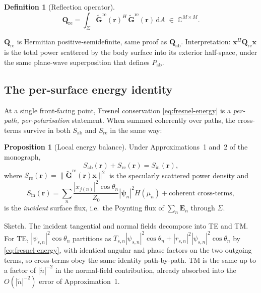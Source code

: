 \documentclass[11pt,a4paper]{article}
\theoremstyle{definition}
\newtheorem{proposition}[proposition]{Proposition}
\newtheorem{definition}[definition]{Definition}
\newcommand{\rr}{\mathbf{r}}
\newcommand{\EE}{\mathbf{E}}
\newcommand{\Sab}{S_{\mathrm{ab}}}
\newcommand{\Sref}{S_{\mathrm{re}}}
\newcommand{\Sinn}{S_{\mathrm{in}}}
\newcommand{\diff}{\mathrm{d}}
\newcommand{\Complex}{\mathbb{C}}
\newcommand{\Gtil}{\tilde{\mathbf{G}}}
\newcommand{\Qabs}{\mathbf{Q}_{\mathrm{ab}}}
\newcommand{\Qref}{\mathbf{Q}_{\mathrm{re}}}
\begin{document}
\begin{definition}[Reflection operator]\label{def:Qref}
\begin{equation}\label{eq:Qref}
  \boxed{\Qref=\int_\Sigma\Gtil^{\mathrm{re}}(\rr)^H\,
                             \Gtil^{\mathrm{re}}(\rr)\,\diff A
         \;\in\;\Complex^{M\times M}.}
\end{equation}
\end{definition}

$\Qref$ is Hermitian positive-semidefinite, same proof as $\Qabs$.
Interpretation: $\mathbf{x}^H\Qref\mathbf{x}$ is the total power
scattered by the body surface into its exterior half-space, under
the same plane-wave superposition that defines $P_{\mathrm{ab}}$.

\subsection{The per-surface energy identity}

At a single front-facing point, Fresnel conservation
\cref{eq:fresnel-energy} is a \emph{per-path, per-polarisation}
statement.  When summed coherently over paths, the cross-terms
survive in both $\Sab$ and $\Sref$ in the same way:

\begin{proposition}[Local energy balance]\label{prop:local}
Under Approximations~1 and~2 of the monograph,
\begin{equation}\label{eq:local-balance}
  \Sab(\rr)+\Sref(\rr)=\Sinn(\rr),
\end{equation}
where $\Sref(\rr)=\|\Gtil^{\mathrm{re}}(\rr)\mathbf{x}\|^2$ is the
specularly scattered power density and
\begin{equation}\label{eq:Sinn}
  \Sinn(\rr)=\sum_n \frac{|x_{j(n)}|^2\cos\theta_n}{Z_0}
             |\bm\psi_n|^2 H(\mu_n)
             +\text{coherent cross-terms},
\end{equation}
is the \emph{incident} surface flux, i.e.\ the Poynting flux of
$\sum_n\EE_n$ through $\Sigma$.
\end{proposition}

Sketch.  The incident tangential and normal fields decompose into
TE and TM.  For TE, $|\psi_{s,n}|^2\cos\theta_n$ partitions as
$T_{s,n}|\psi_{s,n}|^2\cos\theta_n+|r_{s,n}|^2|\psi_{s,n}|^2\cos\theta_n$
by \cref{eq:fresnel-energy}, with identical angular and phase
factors on the two outgoing terms, so cross-terms obey the same
identity path-by-path.  TM is the same up to a factor of
$|\tilde n|^{-2}$ in the normal-field contribution, already absorbed
into the $O(|\tilde n|^{-2})$ error of Approximation~1.
\end{document}
